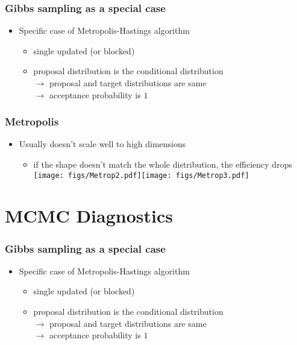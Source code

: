 \documentclass[10pt]{beamer}
\begin{document}
\begin{frame}

\frametitle{Gibbs sampling as a special case}

  \begin{itemize}
  \item Specific case of Metropolis-Hastings algorithm
    \begin{itemize}
    \item single updated (or blocked)
    \item proposal distribution is the conditional distribution\\
      $\rightarrow$ proposal and target distributions are same\\
      $\rightarrow$ acceptance probability is $1$
    \end{itemize}
  \end{itemize}

\end{frame}

\begin{frame}

\frametitle{ Metropolis}

  \begin{itemize}
  \item Usually doesn't scale well to high dimensions
    \begin{itemize}
    \item if the shape doesn't match the whole distribution, the efficiency drops
      \vspace{1\baselineskip}
      \hspace{-1cm}\texttt{[image: figs/Metrop2.pdf]}\texttt{[image: figs/Metrop3.pdf]}
    \end{itemize}
  \end{itemize}

\end{frame}

\section{MCMC Diagnostics}
\frame{\sectionpage}

\begin{frame}

\frametitle{Gibbs sampling as a special case}

  \begin{itemize}
  \item Specific case of Metropolis-Hastings algorithm
    \begin{itemize}
    \item single updated (or blocked)
    \item proposal distribution is the conditional distribution\\
      $\rightarrow$ proposal and target distributions are same\\
      $\rightarrow$ acceptance probability is $1$
    \end{itemize}
  \end{itemize}

\end{frame}
\end{document}
